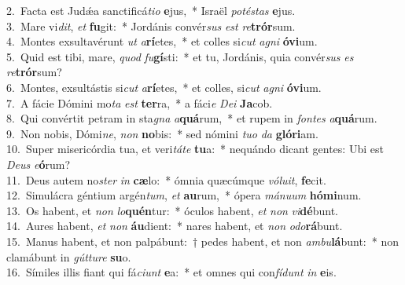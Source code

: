 {2.~}Facta est Judǽa sanctificá\textit{ti}\textit{o} \textbf{e}jus,~* Israël \textit{po}\textit{té}\textit{stas} \textbf{e}jus.\\
{3.~}Mare vi\textit{dit}, \textit{et} \textbf{fu}git:~* Jordánis convér\textit{sus} \textit{est} \textit{re}\textbf{trór}sum.\\
{4.~}Montes exsultavérunt \textit{ut} \textit{a}\textbf{rí}etes,~* et colles si\textit{cut} \textit{a}\textit{gni} \textbf{ó}\textbf{vi}um.\\
{5.~}Quid est tibi, mare, \textit{quod} \textit{fu}\textbf{gí}sti:~* et tu, Jordánis, quia convér\textit{sus} \textit{es} \textit{re}\textbf{trór}sum?\\
{6.~}Montes, exsultástis si\textit{cut} \textit{a}\textbf{rí}etes,~* et colles, si\textit{cut} \textit{a}\textit{gni} \textbf{ó}\textbf{vi}um.\\
{7.~}A fácie Dómini mo\textit{ta} \textit{est} \textbf{ter}ra,~* a fáci\textit{e} \textit{De}\textit{i} \textbf{Ja}cob.\\
{8.~}Qui convértit petram in sta\textit{gna} \textit{a}\textbf{quá}rum,~* et rupem in \textit{fon}\textit{tes} \textit{a}\textbf{quá}rum.\\
{9.~}Non nobis, Dómi\textit{ne}, \textit{non} \textbf{no}bis:~* sed nómini \textit{tu}\textit{o} \textit{da} \textbf{gló}\textbf{ri}am.\\
{10.~}Super misericórdia tua, et veri\textit{tá}\textit{te} \textbf{tu}a:~* nequándo dicant gentes: Ubi est \textit{De}\textit{us} \textit{e}\textbf{ó}rum?\\
{11.~}Deus autem no\textit{ster} \textit{in} \textbf{cæ}lo:~* ómnia quæcúmque \textit{vó}\textit{lu}\textit{it}, \textbf{fe}cit.\\
{12.~}Simulácra géntium argén\textit{tum}, \textit{et} \textbf{au}rum,~* ópera \textit{má}\textit{nu}\textit{um} \textbf{hó}\textbf{mi}num.\\
{13.~}Os habent, et \textit{non} \textit{lo}\textbf{quén}tur:~* óculos habent, \textit{et} \textit{non} \textit{vi}\textbf{dé}bunt.\\
{14.~}Aures habent, \textit{et} \textit{non} \textbf{áu}dient:~* nares habent, et \textit{non} \textit{o}\textit{do}\textbf{rá}bunt.\\
{15.~}Manus habent, et non palpábunt:~† pedes habent, et non \textit{am}\textit{bu}\textbf{lá}bunt:~* non clamábunt in \textit{gút}\textit{tu}\textit{re} \textbf{su}o.\\
{16.~}Símiles illis fiant qui fá\textit{ci}\textit{unt} \textbf{e}a:~* et omnes qui con\textit{fí}\textit{dunt} \textit{in} \textbf{e}is.\\
